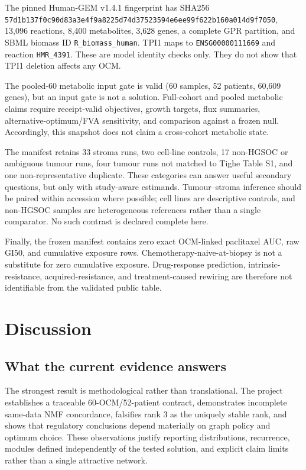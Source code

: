 \documentclass[10pt]{article}
\begin{document}
The pinned Human-GEM v1.4.1 fingerprint has SHA256
\texttt{57d1b137f0c90d83a3e4f9a8225d74d37523594e6ee99f622b160a014d9f7050},
13,096 reactions, 8,400 metabolites, 3,628 genes, a complete GPR partition, and
SBML biomass ID \texttt{R\_biomass\_human}\cite{human1}.  TPI1 maps to
\texttt{ENSG00000111669} and reaction \texttt{HMR\_4391}.  These are model
identity checks only.  They do not show that TPI1 deletion affects any OCM.

The pooled-60 metabolic input gate is valid (60 samples, 52 patients, 60,609
genes), but an input gate is not a solution.  Full-cohort and pooled metabolic
claims require receipt-valid objectives, growth targets, flux summaries,
alternative-optimum/FVA sensitivity, and comparison against a frozen null.
Accordingly, this snapshot does not claim a cross-cohort metabolic state.

The manifest retains 33 stroma runs, two cell-line controls, 17 non-HGSOC or
ambiguous tumour runs, four tumour runs not matched to Tighe Table S1, and one
non-representative duplicate.  These categories can answer useful secondary
questions, but only with study-aware estimands.  Tumour--stroma inference should
be paired within accession where possible; cell lines are descriptive controls,
and non-HGSOC samples are heterogeneous references rather than a single
comparator.  No such contrast is declared complete here.

Finally, the frozen manifest contains zero exact OCM-linked paclitaxel AUC,
raw GI50, and cumulative exposure rows.  Chemotherapy-naive-at-biopsy is not a
substitute for zero cumulative exposure.  Drug-response prediction,
intrinsic-resistance, acquired-resistance, and treatment-caused rewiring are
therefore not identifiable from the validated public table.

\section{Discussion}

\subsection{What the current evidence answers}

The strongest result is methodological rather than translational.  The project
establishes a traceable 60-OCM/52-patient contract, demonstrates incomplete
same-data NMF concordance, falsifies rank 3 as the uniquely stable rank, and
shows that regulatory conclusions depend materially on graph policy and
optimum choice.  These observations justify reporting distributions,
recurrence, modules defined independently of the tested solution, and explicit
claim limits rather than a single attractive network.
\end{document}
